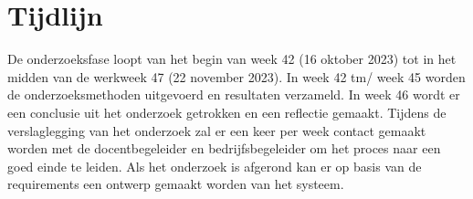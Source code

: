 \section{Tijdlijn}
De onderzoeksfase loopt van het begin van week 42 (16 oktober 2023) tot in het midden van de werkweek 47 (22 november 2023).
In week 42 tm/ week 45 worden de onderzoeksmethoden uitgevoerd en resultaten verzameld.
In week 46 wordt er een conclusie uit het onderzoek getrokken en een reflectie gemaakt.
Tijdens de verslaglegging van het onderzoek zal er een keer per week contact gemaakt worden met de docentbegeleider en bedrijfsbegeleider om het proces naar een goed einde te leiden.
Als het onderzoek is afgerond kan er op basis van de requirements een ontwerp gemaakt worden van het systeem.
